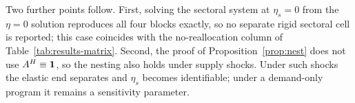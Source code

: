 

Two further points follow. First, solving the sectoral system at $\eta_s=0$
from the $\eta = 0$ solution reproduces all four blocks exactly, so no separate
rigid sectoral cell is reported; this case coincides with the no-reallocation
column of Table~\ref{tab:results-matrix}. Second, the proof of
Proposition~\ref{prop:nest} does not use $A^{H}\equiv\mathbf{1}$, so the nesting also
holds under supply shocks. Under such shocks the elastic end separates and
$\eta_s$ becomes identifiable; under a demand-only program it remains a
sensitivity parameter.
